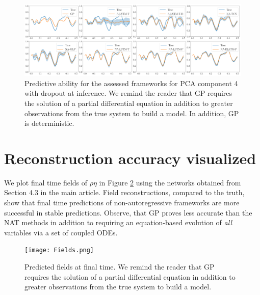 \documentclass[12pt]{article}
\begin{document}
\begin{figure}[h!]
    \centering
    \includegraphics[width=\textwidth]{Figure_4_do.png}
    \caption{Predictive ability for the assessed frameworks for PCA component 4 with dropout at inference. We remind the reader that GP requires the solution of a partial differential equation in addition to greater observations from the true system to build a model. In addition, GP is deterministic.}
    \label{Mode_4_do}
\end{figure}

\section{Reconstruction accuracy visualized}

We plot final time fields of $\rho \eta$ in Figure \ref{Fields} using the networks obtained from Section 4.3 in the main article. Field reconstructions, compared to the truth, show that final time predictions of non-autoregressive frameworks are more successful in stable predictions. Observe, that GP proves less accurate than the NAT methods in addition to requiring an equation-based evolution of \emph{all} variables via a set of coupled ODEs.

\begin{figure}[h!]
    \centering
    \texttt{[image: Fields.png]}
    \caption{Predicted fields at final time. We remind the reader that GP requires the solution of a partial differential equation in addition to greater observations from the true system to build a model.}
    \label{Fields}
\end{figure}

\small


\end{document}
